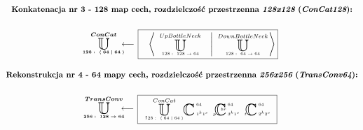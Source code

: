 \begin{equation*}
\begin{gathered}
\textbf{Konkatenacja nr 3 - 128 map cech, rozdzielczość przestrzenna $\textit{128x128}$ ($\textit{ConCat128}$):}
\\~\\
\xunitdef{\boldsymbol{ConCat}}{\boldsymbol{128:\ \langle \; 64 \; | \; 64 \; \rangle}}{\quad
\xaggreg{\quad
\xunit{UpBottleNeck}{128:\ 128\rightarrow64}{}
\quad \left| \quad
\xunit{DownBottleNeck}{128:\ 64\rightarrow64}{}
\right.}}
\\~\\
\textbf{Rekonstrukcja nr 4 - 64 mapy cech, rozdzielczość przestrzenna $\textit{256x256}$ ($\textit{TransConv64}$):}
\\~\\
\xunitdef{\boldsymbol{TransConv}}{\boldsymbol{256:\ 128\rightarrow64}}{\quad
\xunit{ConCat}{128:\ \langle \; 64 \; | \; 64 \; \rangle}{}
\xconv{\ 1^k1^s}{\ 64}{}{}{}
\xconv{\ 3^k1^s}{\ 64}{p}{}{br}
\xconv{\ 2^k2^s}{\ 64}{t}{}{}}
\end{gathered}
\end{equation*}
